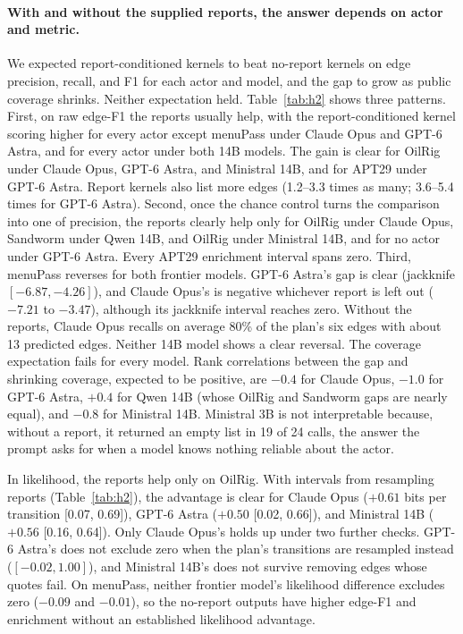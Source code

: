 \documentclass[letterpaper]{article} %
\begin{document}
\paragraph{With and without the supplied reports, the answer depends on actor and metric.} We expected report-conditioned kernels to beat no-report kernels on edge precision, recall, and F1 for each actor and model, and the gap to grow as public coverage shrinks. Neither expectation held. Table~\ref{tab:h2} shows three patterns. First, on raw edge-F1 the reports usually help, with the report-conditioned kernel scoring higher for every actor except menuPass under Claude Opus and GPT-6 Astra, and for every actor under both 14B models. The gain is clear for OilRig under Claude Opus, GPT-6 Astra, and Ministral 14B, and for APT29 under GPT-6 Astra. Report kernels also list more edges (1.2--3.3 times as many; 3.6--5.4 times for GPT-6 Astra). Second, once the chance control turns the comparison into one of precision, the reports clearly help only for OilRig under Claude Opus, Sandworm under Qwen 14B, and OilRig under Ministral 14B, and for no actor under GPT-6 Astra. Every APT29 enrichment interval spans zero. Third, menuPass reverses for both frontier models. GPT-6 Astra's gap is clear (jackknife $[-6.87, -4.26]$), and Claude Opus's is negative whichever report is left out ($-7.21$ to $-3.47$), although its jackknife interval reaches zero. Without the reports, Claude Opus recalls on average 80\% of the plan's six edges with about 13 predicted edges. Neither 14B model shows a clear reversal. The coverage expectation fails for every model. Rank correlations between the gap and shrinking coverage, expected to be positive, are $-0.4$ for Claude Opus, $-1.0$ for GPT-6 Astra, $+0.4$ for Qwen 14B (whose OilRig and Sandworm gaps are nearly equal), and $-0.8$ for Ministral 14B. Ministral 3B is not interpretable because, without a report, it returned an empty list in 19 of 24 calls, the answer the prompt asks for when a model knows nothing reliable about the actor.

In likelihood, the reports help only on OilRig. With intervals from resampling reports (Table~\ref{tab:h2}), the advantage is clear for Claude Opus ($+0.61$ bits per transition [0.07, 0.69]), GPT-6 Astra ($+0.50$ [0.02, 0.66]), and Ministral 14B ($+0.56$ [0.16, 0.64]). Only Claude Opus's holds up under two further checks. GPT-6 Astra's does not exclude zero when the plan's transitions are resampled instead ($[-0.02, 1.00]$), and Ministral 14B's does not survive removing edges whose quotes fail. On menuPass, neither frontier model's likelihood difference excludes zero ($-0.09$ and $-0.01$), so the no-report outputs have higher edge-F1 and enrichment without an established likelihood advantage.
\end{document}
